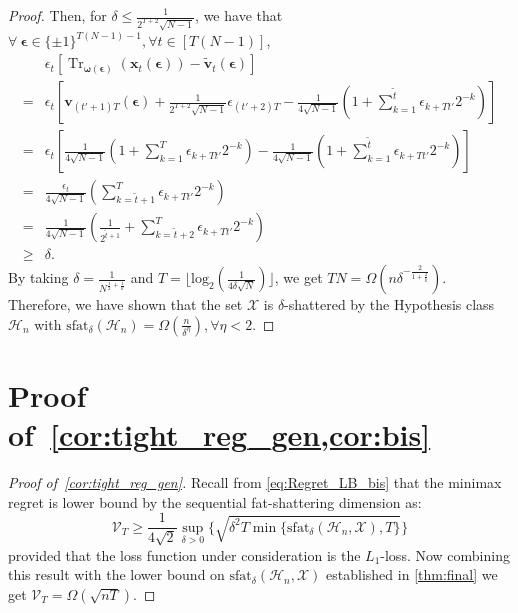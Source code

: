 \begin{proof}
Then, for $\delta\le\frac1{2^{T+2}\sqrt{N-1}}$, we have that $\forall \ \boldsymbol{\epsilon} \in \{\pm 1\}^{T(N-1)-1}, \forall t \in [T(N-1)]$,
\begin{align}
        &\epsilon_t [\operatorname{Tr}_{\boldsymbol \omega(\boldsymbol \epsilon)}(\mathbf{x}_t(\boldsymbol{\epsilon})) - \tilde{\mathbf{v}}_t (\boldsymbol{\epsilon})] \nonumber \\ 
        =& \epsilon_t[\mathbf v_{(t'+1)T}(\boldsymbol\epsilon)+\frac1{2^{T+2}\sqrt{N-1}}\epsilon_{(t'+2)T}-\frac1{4\sqrt{N-1}}(1+\sum_{k=1}^{\tilde t}\epsilon_{k+Tt'}2^{-k})]
        \nonumber\\=&\epsilon_t[\frac1{4\sqrt{N-1}}(1+\sum_{k=1}^{T}\epsilon_{k+Tt'}2^{-k})-\frac1{4\sqrt{N-1}}(1+\sum_{k=1}^{\tilde t}\epsilon_{k+Tt'}2^{-k})]
        \nonumber\\=&\frac{\epsilon_t}{4\sqrt{N-1}}(\sum_{k=\tilde t+1}^{T}\epsilon_{k+Tt'}2^{-k})
        \nonumber\\=&\frac{1}{4\sqrt{N-1}}(\frac{1}{2^{\tilde t+1}}+\sum_{k=\tilde t+2}^{T}\epsilon_{k+Tt'}2^{-k})
        \nonumber\\\ge&\delta.
    \end{align}
By taking $\delta=\frac1{N^{\frac12+\frac1k}}$ and $T=\lfloor\text{log}_2(\frac1{ 4\delta \sqrt{N}})\rfloor$, we get $TN=\Omega( n\delta^{-\frac2{1+\frac2k}})$. Therefore, we have shown that the set $\mathcal{X}$ is $\delta$-shattered by the Hypothesis class $\mathcal{H}_n$ with $\text{sfat}_\delta(\mathcal H_n)=\Omega(\frac n{\delta^\eta}), \forall\eta<2$.
\end{proof}


\section{Proof of~\cref{cor:tight_reg_gen,cor:bis}}\label{pf:cor}

\begin{proof}[Proof of~\cref{cor:tight_reg_gen}]
    Recall from \cref{eq:Regret_LB_bis} that the minimax regret is lower bound by the sequential fat-shattering dimension as:
    $$\mathcal{V}_T \geq \frac{1}{4 \sqrt{2}} \sup_{\delta > 0} \Big\{ \sqrt{\delta^2 T \min\{ \text{sfat}_\delta (\mathcal{H}_n, \mathcal{X}), T\}} \Big\}$$
    provided that the loss function under consideration is the $L_1$-loss.
    Now combining this result with the lower bound on $\text{sfat}_\delta (\mathcal{H}_n, \mathcal{X})$ established in \cref{thm:final} we get $\mathcal{V}_T = \Omega (\sqrt{nT})$. 
\end{proof}

